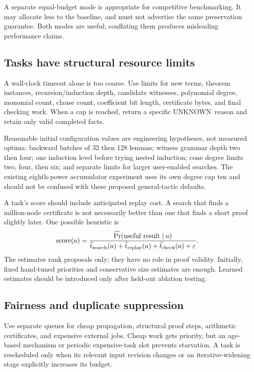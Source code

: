 \documentclass[11pt,a4paper]{article}
\newcommand{\unknown}{\textnormal{UNKNOWN}}
\begin{document}
A separate equal-budget mode is appropriate for competitive benchmarking. It may allocate less to the baseline, and must not advertise the same preservation guarantee. Both modes are useful; conflating them produces misleading performance claims.

\subsection{Tasks have structural resource limits}

A wall-clock timeout alone is too coarse. Use limits for new terms, theorem instances, recursion/induction depth, candidate witnesses, polynomial degree, monomial count, clause count, coefficient bit length, certificate bytes, and final checking work. When a cap is reached, return a specific \unknown\ reason and retain only valid completed facts.

Reasonable initial configuration values are engineering hypotheses, not measured optima: backward batches of 32 then 128 lemmas; witness grammar depth two then four; one induction level before trying nested induction; cone degree limits two, four, then six; and separate limits for larger user-enabled searches. The existing eighth-power accumulator experiment uses its own degree cap ten and should not be confused with these proposed general-tactic defaults.

A task's score should include anticipated replay cost. A search that finds a million-node certificate is not necessarily better than one that finds a short proof slightly later. One possible heuristic is
\[
\operatorname{score}(a)=
\frac{\widehat{\Pr}(\text{useful result}\mid a)}{
 \widehat{t}_{\rm search}(a)+\widehat{t}_{\rm replay}(a)+\widehat{t}_{\rm check}(a)+\varepsilon}.
\]
The estimates rank proposals only; they have no role in proof validity. Initially, fixed hand-tuned priorities and conservative size estimates are enough. Learned estimates should be introduced only after held-out ablation testing.

\subsection{Fairness and duplicate suppression}

Use separate queues for cheap propagation, structural proof steps, arithmetic certificates, and expensive external jobs. Cheap work gets priority, but an age-based mechanism or periodic expensive-task slot prevents starvation. A task is rescheduled only when its relevant input revision changes or an iterative-widening stage explicitly increases its budget.
\end{document}
